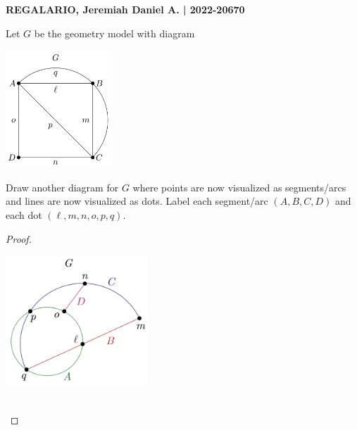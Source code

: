 \documentclass[a4paper, 10pt]{exam}
\begin{document}
\textbf{REGALARIO, Jeremiah Daniel A. | 2022-20670}
\begin{questions}
    \question Let $G$ be the geometry model with diagram
    \begin{center}
        \includegraphics[width=0.3\textwidth]{1.2.png}
    \end{center}
Draw another diagram for $G$ where points are now visualized as segments/arcs and lines are now visualized as dots. Label each segment/arc $(A, B, C, D)$ and each dot $( \ell, m, n, o, p, q).$
    \begin{proof}
        \begin{center}
            \includegraphics[width=0.4\textwidth]{2.1.png}
        \end{center}
        \\
    \end{proof}
    
\end{questions}
\end{document}
